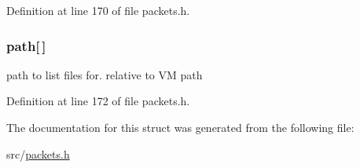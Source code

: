 Definition at line 170 of file packets.\+h.

\hypertarget{struct_l_i_s_t___f_i_l_e_s_a5b52bf017932056c1f97b175be6bd8b1}{}
\subsubsection[{path}]{ path\mbox{[}$\,$\mbox{]}}\label{struct_l_i_s_t___f_i_l_e_s_a5b52bf017932056c1f97b175be6bd8b1}
path to list files for. relative to V\+M path 

Definition at line 172 of file packets.\+h.



The documentation for this struct was generated from the following file\+:\begin{DoxyCompactItemize}
\item 
src/\hyperlink{packets_8h}{packets.\+h}\end{DoxyCompactItemize}
